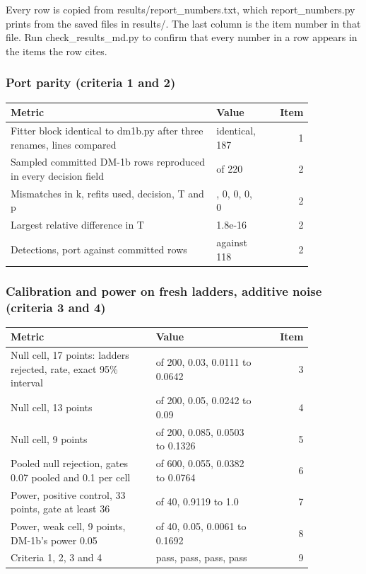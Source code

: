Every row is copied from results/report\_numbers.txt, which report\_numbers.py prints from the saved files in results/. The last column is the item number in that file. Run check\_results\_md.py to confirm that every number in a row appears in the items the row cites.

\subsubsection*{Port parity (criteria 1 and 2)}

{\footnotesize
\begin{longtable}{>{\raggedright\arraybackslash}p{0.685\linewidth}>{\raggedright\arraybackslash}p{0.165\linewidth}r}
\toprule
\textbf{Metric} & \textbf{Value} & \textbf{Item} \\
\midrule
\endhead
\bottomrule
\endfoot
Fitter block identical to dm1b.py after three renames, lines compared & identical, 187 & 1 \\
Sampled committed DM-1b rows reproduced in every decision field & 220 of 220 & 2 \\
Mismatches in k, refits used, decision, T and p & 0, 0, 0, 0, 0 & 2 \\
Largest relative difference in T & 1.8e-16 & 2 \\
Detections, port against committed rows & 118 against 118 & 2 \\
\end{longtable}
}

\subsubsection*{Calibration and power on fresh ladders, additive noise (criteria 3 and 4)}

{\footnotesize
\begin{longtable}{>{\raggedright\arraybackslash}p{0.489\linewidth}>{\raggedright\arraybackslash}p{0.361\linewidth}r}
\toprule
\textbf{Metric} & \textbf{Value} & \textbf{Item} \\
\midrule
\endhead
\bottomrule
\endfoot
Null cell, 17 points: ladders rejected, rate, exact 95\% interval & 6 of 200, 0.03, 0.0111 to 0.0642 & 3 \\
Null cell, 13 points & 10 of 200, 0.05, 0.0242 to 0.09 & 4 \\
Null cell, 9 points & 17 of 200, 0.085, 0.0503 to 0.1326 & 5 \\
Pooled null rejection, gates 0.07 pooled and 0.1 per cell & 33 of 600, 0.055, 0.0382 to 0.0764 & 6 \\
Power, positive control, 33 points, gate at least 36 & 40 of 40, 0.9119 to 1.0 & 7 \\
Power, weak cell, 9 points, DM-1b's power 0.05 & 2 of 40, 0.05, 0.0061 to 0.1692 & 8 \\
Criteria 1, 2, 3 and 4 & pass, pass, pass, pass & 9 \\
\end{longtable}
}

